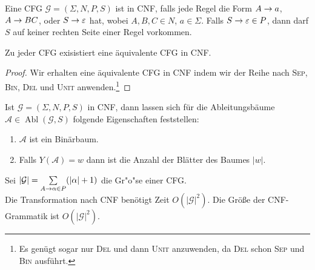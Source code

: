 \begin{Def}[name={[\acs*{CFG} in \acs*{CNF}]}]
	Eine CFG $\mathcal{G} = (\Sigma, N, P, S)$ ist in CNF, falls jede
  Regel die Form $A\->a$, $A\->BC$, oder $S \-> \Eps$ hat, wobei $A,B,C\in N$, $a\in\Sigma$.
  Falls $S \to \varepsilon \in P$, dann darf $S$ auf keiner rechten Seite einer Regel vorkommen.
\end{Def}
\begin{Satz}
Zu jeder CFG exisistiert eine äquivalente CFG in CNF.
\end{Satz}

\begin{proof}
    Wir erhalten eine äquivalente CFG in CNF indem wir 
    der Reihe nach \textsc{Sep}, \textsc{Bin}, \textsc{Del} und \textsc{Unit} anwenden.\footnote{Es genügt sogar nur \textsc{Del} und dann \textsc{Unit} anzuwenden, da \textsc{Del} schon \textsc{Sep} und \textsc{Bin} ausführt.}
\end{proof}

\begin{Beobachtung}
  Ist $\mathcal{G} = (\Sigma, N, P, S)$ in CNF, dann lassen sich für die Ableitungsbäume $\mathcal{A} \in \operatorname{Abl}(\mathcal{G}, S)$ folgende Eigenschaften feststellen:
  \begin{enumerate}
  \item $\mathcal{A}$ ist ein Binärbaum. 
  \item Falls $Y(\mathcal{A}) = w$ dann ist die Anzahl der Blätter des Baumes $|w|$.		%
  \end{enumerate}
\end{Beobachtung}
	
\begin{Bemerkung} Sei $|\mathcal{G}|=\sum\limits_{A\->\alpha\in P}(|\alpha|+1)$ die Gr"o"se einer CFG.\\
Die Transformation nach \ac{CNF} benötigt Zeit $O(|\mathcal{G}|^2)$. Die Größe der \ac{CNF}-Grammatik ist $O(|\mathcal{G}|^2)$.
\end{Bemerkung}


